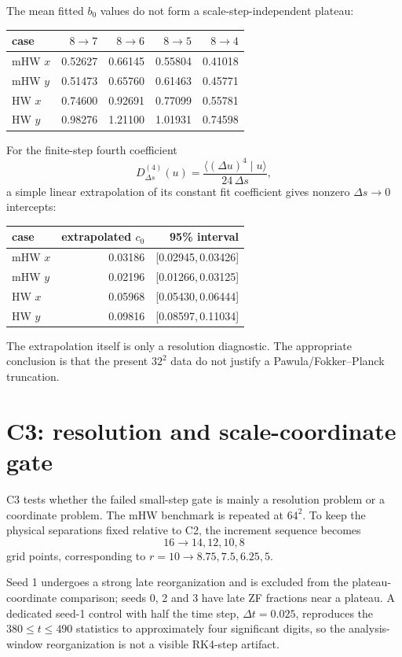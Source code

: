 \documentclass[11pt,a4paper]{article}
\begin{document}
The mean fitted $b_0$ values do not form a scale-step-independent plateau:
\begin{center}
\begin{tabular}{lrrrr}
\toprule
case & $8\to7$ & $8\to6$ & $8\to5$ & $8\to4$\\
\midrule
mHW $x$ & 0.52627 & 0.66145 & 0.55804 & 0.41018\\
mHW $y$ & 0.51473 & 0.65760 & 0.61463 & 0.45771\\
HW $x$ & 0.74600 & 0.92691 & 0.77099 & 0.55781\\
HW $y$ & 0.98276 & 1.21100 & 1.01931 & 0.74598\\
\bottomrule
\end{tabular}
\end{center}

For the finite-step fourth coefficient
\[
D^{(4)}_{\Delta s}(u)=
\frac{\langle(\Delta u)^4\mid u\rangle}{24\,\Delta s},
\]
a simple linear extrapolation of its constant fit coefficient gives nonzero $\Delta s\to0$ intercepts:
\begin{center}
\begin{tabular}{lrr}
\toprule
case & extrapolated $c_0$ & 95\% interval\\
\midrule
mHW $x$ & 0.03186 & [0.02945,\,0.03426]\\
mHW $y$ & 0.02196 & [0.01266,\,0.03125]\\
HW $x$ & 0.05968 & [0.05430,\,0.06444]\\
HW $y$ & 0.09816 & [0.08597,\,0.11034]\\
\bottomrule
\end{tabular}
\end{center}
The extrapolation itself is only a resolution diagnostic. The appropriate conclusion is that the present $32^2$ data do not justify a Pawula/Fokker--Planck truncation.

\section{C3: resolution and scale-coordinate gate}
C3 tests whether the failed small-step gate is mainly a resolution problem or a coordinate problem. The mHW benchmark is repeated at $64^2$. To keep the physical separations fixed relative to C2, the increment sequence becomes
\[
16\to14,12,10,8
\]
grid points, corresponding to $r=10\to8.75,7.5,6.25,5$.

Seed 1 undergoes a strong late reorganization and is excluded from the plateau-coordinate comparison; seeds 0, 2 and 3 have late ZF fractions near a plateau. A dedicated seed-1 control with half the time step, $\Delta t=0.025$, reproduces the $380\le t\le490$ statistics to approximately four significant digits, so the analysis-window reorganization is not a visible RK4-step artifact.
\end{document}
